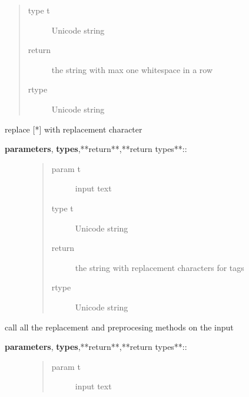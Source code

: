 \documentclass[letterpaper,10pt,english]{sphinxmanual}
\begin{document}
\begin{fulllineitems}
\begin{fulllineitems}
\begin{description}
\begin{quote}
\begin{description}
\item[{type t}] \leavevmode
Unicode string

\item[{return}] \leavevmode
the string with max one whitespace in a row

\item[{rtype}] \leavevmode
Unicode string

\end{description}\end{quote}

\end{description}

\end{fulllineitems}


\begin{fulllineitems}
\label{API:norm.prepro.rewrite.Rewrite.replace_tags}
replace {[}*{]} with replacement character
\begin{description}
\item[{\textbf{parameters}, \textbf{types},**return**,**return types**::}] \leavevmode\begin{quote}\begin{description}
\item[{param t}] \leavevmode
input text

\item[{type t}] \leavevmode
Unicode string

\item[{return}] \leavevmode
the string with replacement characters for tags

\item[{rtype}] \leavevmode
Unicode string

\end{description}\end{quote}

\end{description}

\end{fulllineitems}


\begin{fulllineitems}
\label{API:norm.prepro.rewrite.Rewrite.rewrite_text}
call all the replacement and preprocesing methods on the input
\begin{description}
\item[{\textbf{parameters}, \textbf{types},**return**,**return types**::}] \leavevmode\begin{quote}\begin{description}
\item[{param t}] \leavevmode
input text


\end{description}
\end{quote}
\end{description}
\end{fulllineitems}
\end{fulllineitems}
\end{document}

